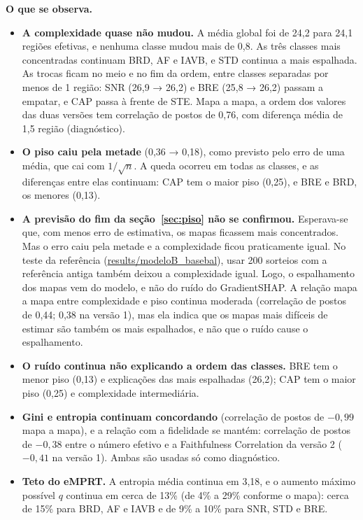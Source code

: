 \documentclass[11pt,a4paper]{article}
\begin{document}
\textbf{O que se observa.}
\begin{itemize}
\item \textbf{A complexidade quase não mudou.} A média global foi de 24,2 para 24,1 regiões efetivas, e nenhuma classe mudou mais de 0,8. As três classes mais concentradas continuam BRD, AF e IAVB, e STD continua a mais espalhada. As trocas ficam no meio e no fim da ordem, entre classes separadas por menos de 1 região: SNR (26,9 → 26,2) e BRE (25,8 → 26,2) passam a empatar, e CAP passa à frente de STE. Mapa a mapa, a ordem dos valores das duas versões tem correlação de postos de 0,76, com diferença média de 1,5 região (diagnóstico).
\item \textbf{O piso caiu pela metade} (0,36 → 0,18), como previsto pelo erro de uma média, que cai com $1/\sqrt{n}$. A queda ocorreu em todas as classes, e as diferenças entre elas continuam: CAP tem o maior piso (0,25), e BRE e BRD, os menores (0,13).
\item \textbf{A previsão do fim da seção~\ref{sec:piso} não se confirmou.} Esperava-se que, com menos erro de estimativa, os mapas ficassem mais concentrados. Mas o erro caiu pela metade e a complexidade ficou praticamente igual. No teste da referência (\url{results/modeloB_basebal}), usar 200 sorteios com a referência antiga também deixou a complexidade igual. Logo, o espalhamento dos mapas vem do modelo, e não do ruído do GradientSHAP. A relação mapa a mapa entre complexidade e piso continua moderada (correlação de postos de 0,44; 0,38 na versão 1), mas ela indica que os mapas mais difíceis de estimar são também os mais espalhados, e não que o ruído cause o espalhamento.
\item \textbf{O ruído continua não explicando a ordem das classes.} BRE tem o menor piso (0,13) e explicações das mais espalhadas (26,2); CAP tem o maior piso (0,25) e complexidade intermediária.
\item \textbf{Gini e entropia continuam concordando} (correlação de postos de $-0{,}99$ mapa a mapa), e a relação com a fidelidade se mantém: correlação de postos de $-0{,}38$ entre o número efetivo e a Faithfulness Correlation da versão 2 ($-0{,}41$ na versão 1). Ambas são usadas só como diagnóstico.
\item \textbf{Teto do eMPRT.} A entropia média continua em 3,18, e o aumento máximo possível $q$ continua em cerca de 13\% (de 4\% a 29\% conforme o mapa): cerca de 15\% para BRD, AF e IAVB e de 9\% a 10\% para SNR, STD e BRE.
\end{itemize}
\end{document}
